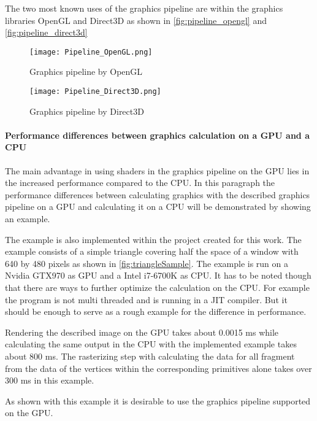 The two most known uses of the graphics pipeline are within the graphics libraries OpenGL and Direct3D as shown in  \autoref{fig:pipeline_opengl} and \autoref{fig:pipeline_direct3d}

\begin{figure}[h!]
  \centering 
  \texttt{[image: Pipeline\_OpenGL.png]}
  \caption[Graphics pipeline by OpenGL ]{Graphics pipeline by OpenGL}
  \label{fig:pipeline_opengl}
\end{figure}

\begin{figure}[h!]
  \centering 
  \texttt{[image: Pipeline\_Direct3D.png]}
  \caption[Graphics pipeline by Direct3D ]{Graphics pipeline by Direct3D}
  \label{fig:pipeline_direct3d}
\end{figure}

\paragraph{Performance differences between graphics calculation on a GPU and a CPU}

The main advantage in using shaders in the graphics pipeline on the GPU lies in the increased performance compared to the CPU.
In this paragraph the performance differences between calculating graphics with the described graphics pipeline on a GPU and calculating it on a CPU will be demonstrated by showing an example.

The example is also implemented within the project created for this work. The example consists of a simple triangle covering half the space of a window with 640 by 480 pixels as shown in \autoref{fig:triangleSample}. The example is run on a Nvidia GTX970 as GPU and a Intel i7-6700K as CPU. It has to be noted though that there are ways to further optimize the calculation on the CPU. For example the program is not multi threaded and is running in a JIT compiler. But it should be enough to serve as a rough example for the difference in performance.

Rendering the described image on the GPU takes about 0.0015 ms while calculating the same output in the CPU with the implemented example takes about 800 ms. The rasterizing step with calculating the data for all fragment from the data of the vertices within the corresponding primitives alone takes over 300 ms in this example.

As shown with this example it is desirable to use the graphics pipeline supported on the GPU.


